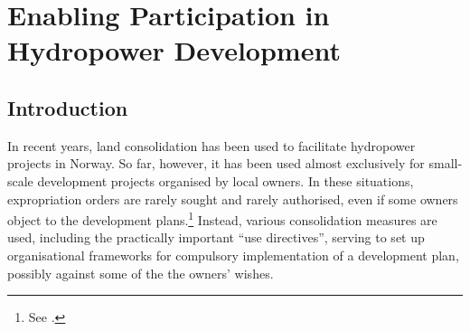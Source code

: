 \chapter{Enabling Participation in Hydropower Development}\label{chap:6}

\section{Introduction}\label{sec:6:1}


In recent years, land consolidation has been used to facilitate hydropower projects in Norway. So far, however, it has been used almost exclusively for small-scale development projects organised by local owners. In these situations, expropriation orders are rarely sought and rarely authorised, even if some owners object to the development plans.\footnote{See \cite{brekken08}.} Instead, various consolidation measures are used, including the practically important ``use directives'', serving to set up organisational frameworks for compulsory implementation of a development plan, possibly against some of the the owners' wishes.

